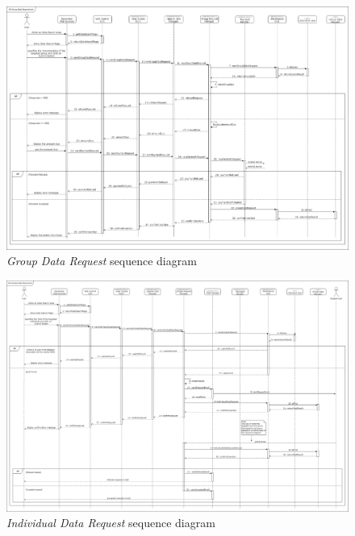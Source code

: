 \begin{figure}[H]
  \begin{center}
  	\includegraphics[width=\textwidth]{./img/sequence/groupDataRequest.png}
    \hspace{0.05\linewidth}
    \centering
    \caption{\textit{Group Data Request} sequence diagram}
		\label{img:groupDataRequest}
    \end{center}
\end{figure}

\begin{figure}[H]
  \begin{center}
  	\includegraphics[width=\textwidth]{./img/sequence/individualDataRequest.png}
    \hspace{0.05\linewidth}
    \centering
    \caption{\textit{Individual Data Request} sequence diagram}
		\label{img:individualDataRequest}
    \end{center}
\end{figure}

